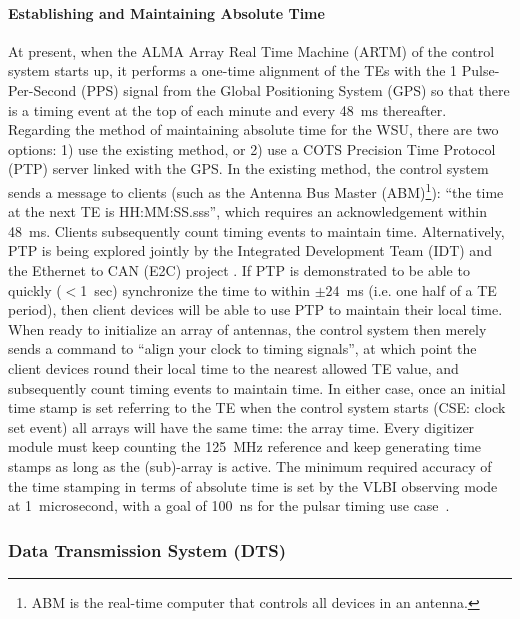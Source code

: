 \paragraph{Establishing and Maintaining Absolute Time}
At present, when the ALMA Array Real Time Machine (ARTM) of the control system starts up, it performs a one-time alignment of the TEs with the 1 Pulse-Per-Second (PPS) signal from the Global Positioning System (GPS) so that there is a timing event at the top of each minute and every 48~ms thereafter. Regarding the method of maintaining absolute time for the WSU, there are two options: 1) use the existing method, or 2) use a COTS Precision Time Protocol (PTP) server linked with the GPS.  In the existing method, the control system sends a message to clients (such as the Antenna Bus Master (ABM)\footnote{ABM is the real-time computer that controls all devices in an antenna.}): ``the time at the next TE is HH:MM:SS.sss'', which requires an acknowledgement within 48~ms. Clients subsequently count timing events to maintain time.   Alternatively, PTP is being explored jointly by the Integrated Development Team (IDT) and the Ethernet to CAN (E2C) project \cite{e2cDescription}.  If PTP is demonstrated to be able to quickly ($<$1~sec) synchronize the time to within $\pm24$~ms (i.e. one half of a TE period), then client devices will be able to use PTP to maintain their local time. When ready to initialize an array of antennas, the control system then merely sends a command to ``align your clock to timing signals'', at which point the client devices round their local time to the nearest allowed TE value, and subsequently count timing events to maintain time.  In either case, once an initial time stamp is set referring to the TE when the control system starts (CSE: clock set event) all arrays will have the same time: the array time.  Every digitizer module must keep counting the 125~MHz reference and keep generating time stamps as long as the (sub)-array is active.  The minimum required accuracy of the time stamping in terms of absolute time is set by the VLBI observing mode at 1~microsecond, with a goal of 100~ns for the pulsar timing use case~\cite{sys_reqs}.


\subsubsection{Data Transmission System (DTS)}
\label{sec:DTS}
